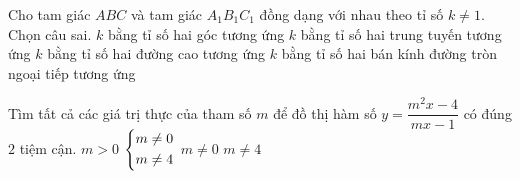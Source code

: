 \begin{ex}%
	Cho tam giác $ABC$ và tam giác $A_1B_1C_1$ đồng dạng với nhau theo tỉ số $k\ne 1$. Chọn câu sai.
	\choice
	{$k$ bằng tỉ số hai góc tương ứng}
	{$k$ bằng tỉ số hai trung tuyến tương ứng}
	{$k$ bằng tỉ số hai đường cao tương ứng}
	{\True $k$ bằng tỉ số hai bán kính đường tròn ngoại tiếp tương ứng}
	\loigiai{}
\end{ex}
\begin{ex}%
	Tìm tất cả các giá trị thực của tham số $m$ để đồ thị hàm số $y=\dfrac{m^{2}x-4}{mx-1}$ có đúng $2$ tiệm cận.
	\choice
	{$m>0$}
	{\True $\left\{\begin{aligned}& m\ne 0 \\ & m\ne 4\end{aligned}\right.$ }
	{$m\ne 0$}
	{$m\ne 4$}
\end{ex}
